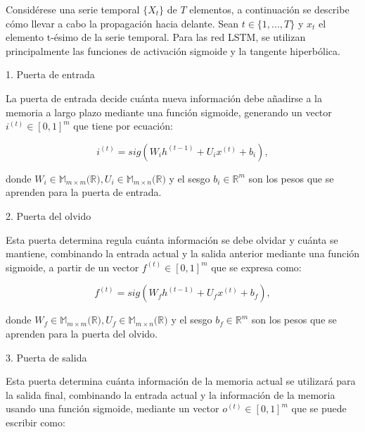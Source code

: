 \documentclass[12pt,twoside]{article}
\begin{document}
Considérese una serie temporal $\{X_t\}$ de $T$ elementos, a continuación se describe cómo llevar a cabo la propagación hacia delante. Sean $t \in \{1,...,T\}$ y $x_t$ el elemento t-ésimo de la serie temporal. Para las red LSTM, se utilizan principalmente las funciones de activación sigmoide y la tangente hiperbólica.

\vspace{0.5em}
\noindent\textnormal{\large 1. Puerta de entrada}
\vspace{0.2em}

La puerta de entrada decide cuánta nueva información debe añadirse a la memoria a largo plazo mediante una función sigmoide, generando un vector $i^{(t)} \in [0,1]^m$ que tiene por ecuación:

\begin{equation}
i^{(t)} = sig(W_ih^{(t-1)} + U_ix^{(t)} +  b_i),
\end{equation}

donde $W_i \in \mathbb{M}_{m \times m}(\mathbb{R)}, U_i \in \mathbb{M}_{m \times n}(\mathbb{R)}$ y el sesgo $b_i \in \mathbb{R}^m$ son los pesos que se aprenden para la puerta de entrada.

\vspace{0.5em}
\noindent\textnormal{\large 2. Puerta del olvido}
\vspace{0.2em}

Esta puerta determina regula cuánta información se debe olvidar y cuánta se mantiene, combinando la entrada actual y la salida anterior mediante una función sigmoide, a partir de un vector $f^{(t)} \in [0,1]^m$ que se expresa como:

 \begin{equation}
 f^{(t)} = sig(W_fh^{(t-1)} + U_fx^{(t)} +  b_f),  
 \end{equation}

donde $W_f \in \mathbb{M}_{m \times m}(\mathbb{R)}, U_f \in \mathbb{M}_{m \times n}(\mathbb{R)}$ y el sesgo $b_f \in \mathbb{R}^m$ son los pesos que se aprenden para la puerta del olvido.

\vspace{0.5em}
\noindent\textnormal{\large 3. Puerta de salida}
\vspace{0.2em}

Esta puerta determina cuánta información de la memoria actual se utilizará para la salida final, combinando la entrada actual y la información de la memoria usando una función sigmoide, mediante un vector $o^{(t)} \in [0,1]^m$ que se puede escribir como:
\end{document}
